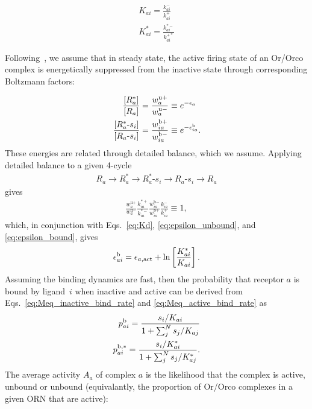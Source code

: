 \documentclass[letterpaper,12pt]{article}
\begin{document}
	
	\begin{align}
	K_{ai} = \frac{k^-_{ai}}{k^+_{ai}} \nonumber \\
	K^*_{ai} = \frac{k^{*-}_{ai}}{k^{+*}_{ai}} 
	\label{eq:Kd}
	\end{align}
	
	Following~\cite{srinivas_elife}, we assume that in steady state, the active firing state of an Or/Orco complex is energetically suppressed from the inactive state through corresponding Boltzmann factors:
	
	\begin{align}
	\frac{[R^*_a]}{[R_a]} &= \frac{w^{\text{u}+}_a}{w^{\text{u}-}_a} \equiv e^{-\epsilon_a} \label{eq:epsilon_unbound} \\
	\frac{[R^*_a\text{-}s_i]}{[R_a\text{-}s_i]} &= \frac{w^{\text{b}+}_{ia}}{w^{\text{b}-}_{ia}} \equiv e^{-\epsilon^{\text b}_{ia}}.\label{eq:epsilon_bound}
	\end{align}
	These energies are related through detailed balance, which we assume. Applying detailed balance to a given 4-cycle 
	\begin{align}
	R_a \rightarrow R_a^* \rightarrow R_a^*\text{-}s_i \rightarrow R_a\text{-}s_i \rightarrow R_a
	\end{align}
	gives
	\begin{align}
	\frac{w^{\text{u}+}_a}{w^{\text{u}-}_a}\frac{k^{*+}_{ia}}{k^{*-}_{ia}}\frac{w^{\text{b}-}_{ia}}{w^{\text{b}+}_{ia}}\frac{k^{-}_{ia}}{k^{+}_{ia}} \equiv 1,
	\label{eq:detailed_balance}
	\end{align}
	which, in conjunction with Eqs.~\ref{eq:Kd}, \ref{eq:epsilon_unbound}, and \ref{eq:epsilon_bound}, gives
	\begin{align}
	\epsilon_{ai}^{\text b} = \epsilon_{a, \textup{act}} + \ln\left[\frac{K^*_{ai}}{K_{ai}}\right].
	\label{testing_equation}
	\end{align}
	Assuming the binding dynamics are fast, then the probability that receptor $a$ is bound by ligand~$i$ when inactive and active can be derived from  Eqs.~\ref{eq:Meq_inactive_bind_rate} and \ref{eq:Meq_active_bind_rate} as
	\begin{align}
	p^{\text b}_{ai} = \frac{s_i/K_{ai}}{1 + \sum_j^Ns_j/K_{aj}} \label{eq:bound_prob_ai_inactive} \\
	p^{\text b, *}_{ai} = \frac{s_i/K^*_{ai}}{1 + \sum_j^Ns_j/K^*_{aj}} \label{eq:bound_prob_ai_active}.
	\end{align}
	The average  activity $A_a$ of complex $a$ is the likelihood that the complex is active, unbound or unbound (equivalantly, the proportion of Or/Orco complexes in a given ORN that are active):
\end{document}
